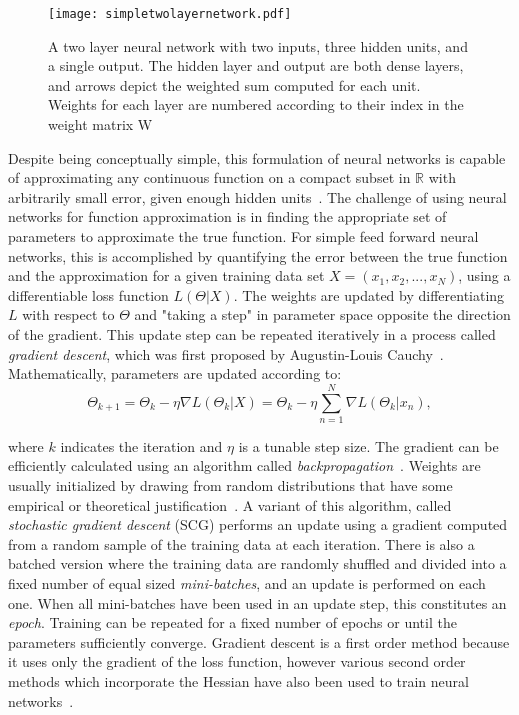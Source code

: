 \begin{figure}
	\centering
	\texttt{[image: simpletwolayernetwork.pdf]}
	\caption{A two layer neural network with two inputs, three hidden units, and a single output. The hidden layer and output are both dense layers, and arrows depict the weighted sum computed for each unit. Weights for each layer are numbered according to their index in the weight matrix W}
	\label{fig:twolayernetwork}
\end{figure}


Despite being conceptually simple, this formulation of neural networks is capable of approximating any continuous function on a compact subset in $\mathbb{R}$ with arbitrarily small error, given enough hidden units~\cite{cybenko1989}.
The challenge of using neural networks for function approximation is in finding the appropriate set of parameters to approximate the true function.
For simple feed forward neural networks, this is accomplished by quantifying the error between the true function and the approximation for a given training data set $X=(x_1, x_2, ..., x_N)$, using a differentiable loss function $L(\Theta | X)$. 
The weights are updated by differentiating $L$ with respect to $\Theta$ and "taking a step" in parameter space opposite the direction of the gradient. 
This update step can be repeated iteratively in a process called \emph{gradient descent}, which was first proposed by Augustin-Louis Cauchy~\cite{cauchy1847}.
Mathematically, parameters are updated according to:
\begin{equation}
\Theta_{k+1} = \Theta_k - \eta \nabla L(\Theta_k | X) = \Theta_k - \eta \sum_{n=1}^{N} \nabla L(\Theta_k | x_n),
\label{eq:batch_gd}
\end{equation}

\noindent
where $k$ indicates the iteration and $\eta$ is a tunable step size.
The gradient can be efficiently calculated using an algorithm called \emph{backpropagation}~\cite{rumelhart1988}.
Weights are usually initialized by drawing from random distributions that have some empirical or theoretical justification~\cite{glorot2010}.
A variant of this algorithm, called \emph{stochastic gradient descent} (SCG) performs an update using a gradient computed from a random sample of the training data at each iteration.
There is also a batched version where the training data are randomly shuffled and divided into a fixed number of equal sized \emph{mini-batches}, and an update is performed on each one. 
When all mini-batches have been used in an update step, this constitutes an \emph{epoch}.
Training can be repeated for a fixed number of epochs or until the parameters sufficiently converge.
Gradient descent is a first order method because it uses only the gradient of the loss function, however various second order methods which incorporate the Hessian have also been used to train neural networks~\cite{fletcher1964, polak1969, moller1993, marquardt1963}.

